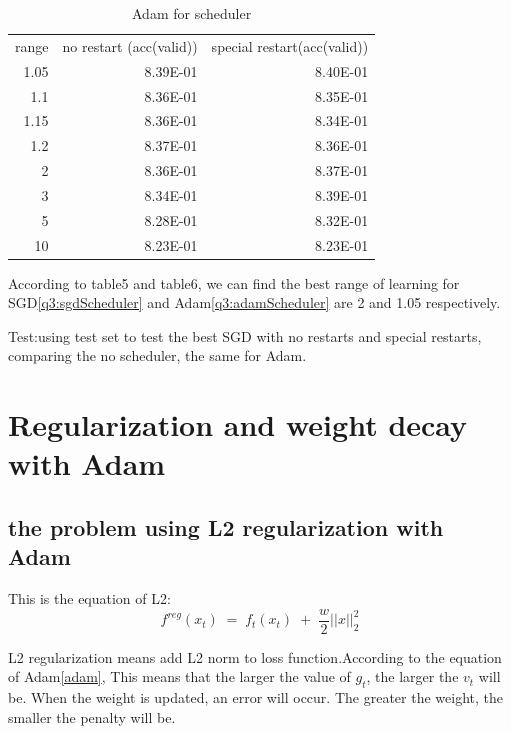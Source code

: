 \documentclass{article}
\begin{document}
\begin{table}[H]\label{q3:adamScheduler}
  \centering
  \caption{Adam for scheduler}
    \begin{tabular}{rrr}
    \multicolumn{1}{l}{range} & \multicolumn{1}{l}{no restart (acc(valid))} & \multicolumn{1}{l}{special restart(acc(valid))} \\
    1.05  & 8.39E-01 & 8.40E-01 \\
    1.1   & 8.36E-01 & 8.35E-01 \\
    1.15  & 8.36E-01 & 8.34E-01 \\
    1.2   & 8.37E-01 & 8.36E-01 \\
    2     & 8.36E-01 & 8.37E-01 \\
    3     & 8.34E-01 & 8.39E-01 \\
    5     & 8.28E-01 & 8.32E-01 \\
    10    & 8.23E-01 & 8.23E-01 \\
    \end{tabular}%
  \label{tab:addlabel}%
\end{table}%


According to table5 and table6, we can find the best range of learning for SGD\ref{q3:sgdScheduler} and Adam\ref{q3:adamScheduler} are 2 and 1.05 respectively.


Test:using test set to test the best SGD with no restarts and special restarts, comparing the no scheduler, the same for Adam.




\section{Regularization and weight decay with Adam}

\subsection{the problem using L2 regularization with Adam}

This is the equation of L2:
\begin{equation}
f^{reg}(x_t)\;=\;f_t(x_t)\;+\;\frac w2\vert\vert x\vert\vert_2^2
\end{equation}

L2 regularization means add L2 norm to loss function.According to the equation of Adam\ref{adam}, This means that the larger the value of $ g_t$, the larger the $v_t$ will be. When the weight is updated, an error will occur. The greater the weight, the smaller the penalty will be.
\end{document}
